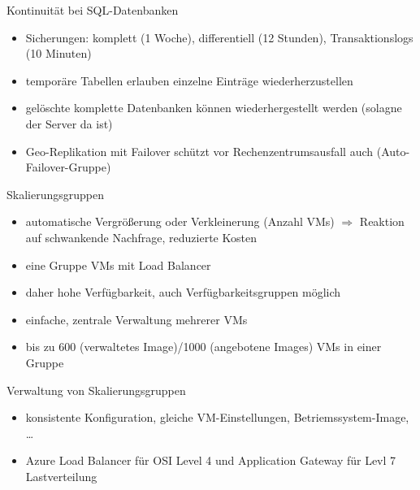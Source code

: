 \begin{flashcard}[]{Kontinuität bei SQL-Datenbanken}
  \begin{itemize}
    \item Sicherungen: komplett (1 Woche), differentiell (12 Stunden), Transaktionslogs (10 Minuten)
    \item temporäre Tabellen erlauben einzelne Einträge wiederherzustellen
    \item gelöschte komplette Datenbanken können wiederhergestellt werden (solagne der Server da ist)
    \item Geo-Replikation mit Failover schützt vor Rechenzentrumsausfall\newline
      auch (Auto-Failover-Gruppe)
  \end{itemize}
\end{flashcard}


\begin{flashcard}[]{Skalierungsgruppen}
  \begin{itemize}
    \item automatische Vergrößerung oder Verkleinerung (Anzahl VMs)\newline
      $\Rightarrow$ Reaktion auf schwankende Nachfrage, reduzierte Kosten
    \item eine Gruppe VMs mit Load Balancer
    \item daher hohe Verfügbarkeit, auch Verfügbarkeitsgruppen möglich
    \item einfache, zentrale Verwaltung mehrerer VMs
    \item bis zu 600 (verwaltetes Image)/1000 (angebotene Images) VMs in einer Gruppe
  \end{itemize}
\end{flashcard}

\begin{flashcard}[]{Verwaltung von Skalierungsgruppen}
  \begin{itemize}
    \item konsistente Konfiguration, gleiche VM-Einstellungen, Betriemssystem-Image, \ldots
    \item Azure Load Balancer für OSI Level 4 und Application Gateway für Levl 7 Lastverteilung
  \end{itemize}
\end{flashcard}


